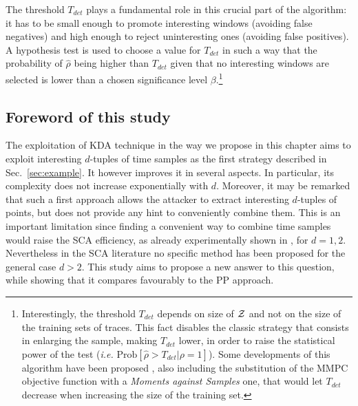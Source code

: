 The threshold $T_{det}$ plays a fundamental role in this crucial part of the algorithm: it has to be small enough to promote interesting windows (avoiding false negatives) and high enough to reject uninteresting ones (avoiding false positives). A hypothesis test is used to choose a value for $T_{det}$ in such a way that the probability of $\hat{\rho}$ being higher than $T_{det}$ given that no interesting windows are selected is lower than a chosen significance level $\beta$.\footnote{Interestingly, the threshold $T_{det}$ depends on size of $\mathcal{Z}$ and not on the size of the training sets of traces. This fact disables the classic strategy that consists in enlarging the sample, making $T_{det}$ lower, in order to raise the statistical power of the test (\emph{i.e.} $\mathrm{Prob}[\hat{\rho}>T_{det}\vert \rho=1]$). Some developments of this algorithm have been proposed \cite{durvauximproved}, also including the substitution of the MMPC objective function with a \emph{Moments against Samples} one, that would let $T_{det}$ decrease when increasing the size of the training set.} \\

\subsection{Foreword of this study}

The exploitation of KDA technique in the way we propose in this chapter aims to exploit interesting $d$-tuples of time samples as the first strategy described in Sec.~\ref{sec:example}. It however improves it in several aspects. In particular, its complexity does not increase exponentially with $d$. Moreover, it may be remarked that such a first approach allows the attacker to extract interesting $d$-tuples of points, but does not provide any hint to conveniently combine them. This is an important limitation since  finding a convenient way to combine time samples would raise the SCA efficiency, as already experimentally shown in \cite{boosting}, for $d = 1,2$. Nevertheless in the SCA literature no specific method has been proposed for the general case $d>2$.  This study aims to propose a new answer to this question, while showing that it compares favourably to the PP approach.

